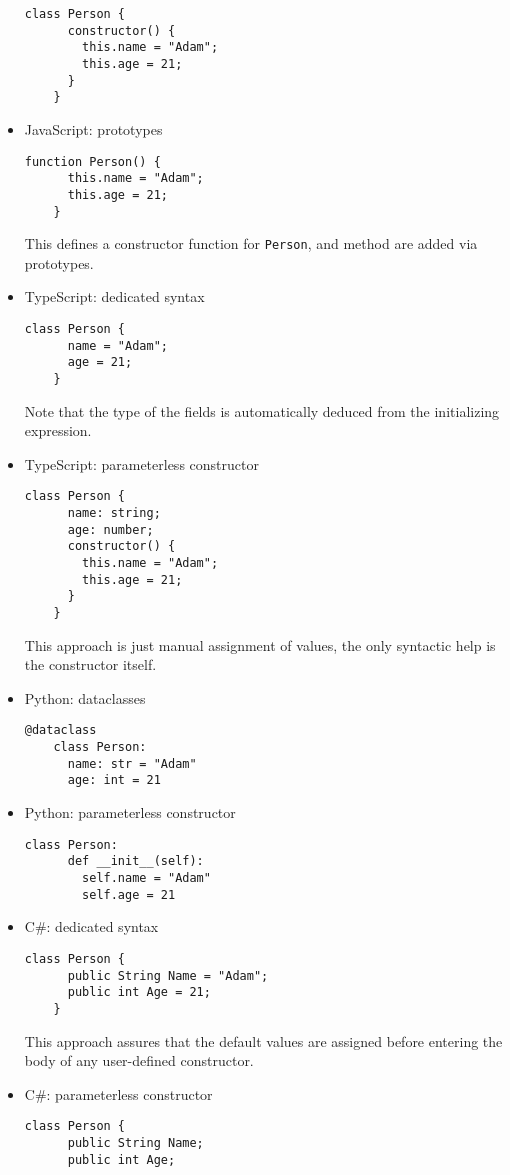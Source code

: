 \documentclass[en]{pracamgr}
\begin{document}
\begin{itemize}
\begin{lstlisting}[style=JavaScript]
    class Person {
      constructor() {
        this.name = "Adam";
        this.age = 21;
      }
    }
  \end{lstlisting}
  \item JavaScript: prototypes
  \begin{lstlisting}[style=JavaScript]
    function Person() {
      this.name = "Adam";
      this.age = 21;
    }
  \end{lstlisting}
  This defines a constructor function for \texttt{Person}, and method are added via prototypes.
  \item TypeScript: dedicated syntax
  \begin{lstlisting}[style=TypeScript]
    class Person {
      name = "Adam";
      age = 21;
    }
  \end{lstlisting}
  Note that the type of the fields is automatically deduced from the initializing expression.
  \item TypeScript: parameterless constructor
  \begin{lstlisting}[style=TypeScript]
    class Person {
      name: string;
      age: number;
      constructor() {
        this.name = "Adam";
        this.age = 21;
      }
    }
  \end{lstlisting}
  This approach is just manual assignment of values, the only syntactic help is the constructor itself.
  \item Python: dataclasses
  \begin{lstlisting}[style=Python]
    @dataclass
    class Person:
      name: str = "Adam"
      age: int = 21
  \end{lstlisting}
  \item Python: parameterless constructor
  \begin{lstlisting}[style=Python]
    class Person:
      def __init__(self):
        self.name = "Adam"
        self.age = 21
  \end{lstlisting}
  \item C\#: dedicated syntax
  \begin{lstlisting}[style=CSharp]
    class Person {
      public String Name = "Adam";
      public int Age = 21;
    }
  \end{lstlisting}
  This approach assures that the default values are assigned before entering the body of any user-defined constructor.
  \item C\#: parameterless constructor
  \begin{lstlisting}[style=CSharp]
    class Person {
      public String Name;
      public int Age;

\end{lstlisting}
\end{itemize}
\end{document}
